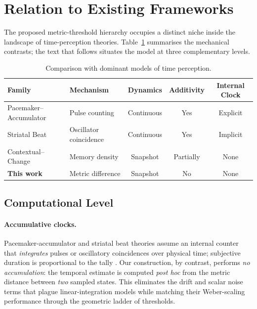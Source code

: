 \documentclass[preprint,11pt]{elsarticle}
\begin{document}
\section{Relation to Existing Frameworks}
The proposed metric-threshold hierarchy occupies a distinct niche
inside the landscape of time-perception theories.
Table~\ref{tab:comparison} summarises the mechanical contrasts; the
text that follows situates the model at three complementary levels.

\begin{table}[ht]
    \centering
    \small
    \begin{tabular}{@{}p{}p{}ccc@{}}
        \toprule
        \textbf{Family} & \textbf{Mechanism} & \textbf{Dynamics} & \textbf{Additivity} & \textbf{Internal Clock} \\
        \midrule
        Pacemaker--Accumulator & Pulse counting & Continuous & Yes & Explicit \\
        Striatal Beat & Oscillator coincidence & Continuous & Yes & Implicit \\
        Contextual--Change & Memory density & Snapshot & Partially & None \\
        \textbf{This work} & Metric difference & Snapshot & No & None \\
        \bottomrule
    \end{tabular}
    \caption{Comparison with dominant models of time perception.}
    \label{tab:comparison}
\end{table}

\subsection{Computational Level}
\paragraph{Accumulative clocks.}
Pacemaker-accumulator and striatal beat theories assume an internal
counter that \emph{integrates} pulses or oscillatory coincidences over
physical time; subjective duration is proportional to the tally
\citep{gibbonscalar,miallbeat}.  Our construction, by contrast, performs
\emph{no accumulation}: the temporal estimate is computed
\emph{post hoc} from the metric distance between \emph{two} sampled
states.  This eliminates the drift and scalar noise terms that plague
linear-integration models while matching their Weber-scaling performance
through the geometric ladder of thresholds.
\end{document}
